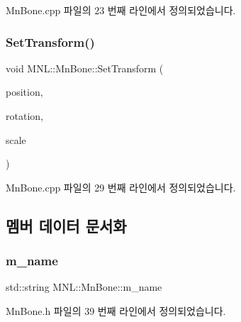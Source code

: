 Mn\+Bone.\+cpp 파일의 23 번째 라인에서 정의되었습니다.

\mbox{\label{class_m_n_l_1_1_mn_bone_ad0b53762b81d65568955c67e59a7c845}} 
\subsubsection{\texorpdfstring{Set\+Transform()}{SetTransform()}\hspace{0.1cm}{\footnotesize\ttfamily [2/2]}}
{\footnotesize\ttfamily void M\+N\+L\+::\+Mn\+Bone\+::\+Set\+Transform (\begin{DoxyParamCaption}\item[{const Direct\+X\+::\+Simple\+Math\+::\+Vector3 \&}]{position,  }\item[{const Direct\+X\+::\+Simple\+Math\+::\+Quaternion \&}]{rotation,  }\item[{const Direct\+X\+::\+Simple\+Math\+::\+Vector3 \&}]{scale }\end{DoxyParamCaption})}



Mn\+Bone.\+cpp 파일의 29 번째 라인에서 정의되었습니다.



\subsection{멤버 데이터 문서화}
\mbox{\label{class_m_n_l_1_1_mn_bone_adca6ae47b891bd0c63393a27f6c6eacb}} 
\subsubsection{\texorpdfstring{m\+\_\+name}{m\_name}}
{\footnotesize\ttfamily std\+::string M\+N\+L\+::\+Mn\+Bone\+::m\+\_\+name\hspace{0.3cm}{\ttfamily [private]}}



Mn\+Bone.\+h 파일의 39 번째 라인에서 정의되었습니다.

\mbox{\label{class_m_n_l_1_1_mn_bone_a73c16374ec9bd66ccb36d8a7f7a022ce}} 
